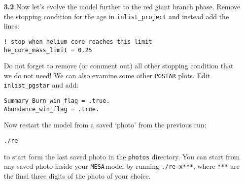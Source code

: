 \documentclass[11pt,a4paper]{article}
\newcommand{\MESA}{\texttt{MESA}\,}
\begin{document}
\begin{enumerate}
\begin{enumerate}
\item When the model stops after 4.6 Gyrs, the star is undergoing hydrogen fusion in its core. How can you identify this from the plots? Also compare the location in the HR diagram to the current parameters of the Sun. Do they agree?

\end{enumerate}

You will have noticed it takes several hundreds of steps to reach the main sequence (start of hydrogen fusion), while subsequently it takes much fewer steps to reach the current age of the Sun. 
The reason is that the structure of the star changes rapidly when the star contracts to the main sequence, so many small time steps are needed for \MESA to resolve these changes. Once the star is on the main sequence, its structure hardly changes, so the code can take much longer time steps to evolve the star through the main sequence phase.

\begin{enumerate}[start =6]
  \item What would you have expected if the number of steps is proportional to the actual time the star takes to evolve? (i.e. compare to the appropriate stellar time scales.)
\end{enumerate}


\item[\bf{3.2}] Now let's evolve the model further to the red giant branch phase. Remove the stopping condition for the age in \verb|inlist_project| and instead add the lines:
\begin{lstlisting}
! stop when helium core reaches this limit
he_core_mass_limit = 0.25
\end{lstlisting}

Do not forget to remove (or comment out) all other stopping condition that we do not need!
 We can also examine some other \texttt{PGSTAR} plots. Edit \verb|inlist_pgstar| and add:
\begin{lstlisting}
Summary_Burn_win_flag = .true.
Abundance_win_flag = .true.
\end{lstlisting}

Now restart the model from a saved `photo' from the previous run:
\begin{lstlisting}
./re 
\end{lstlisting}%
to start form the last saved photo in the \texttt{photos} directory. 
You can start from any saved photo inside your \MESA model by running \verb|./re x***|, where \verb|***| are the final three digits of the photo of your choice.


\end{enumerate}
\end{document}
